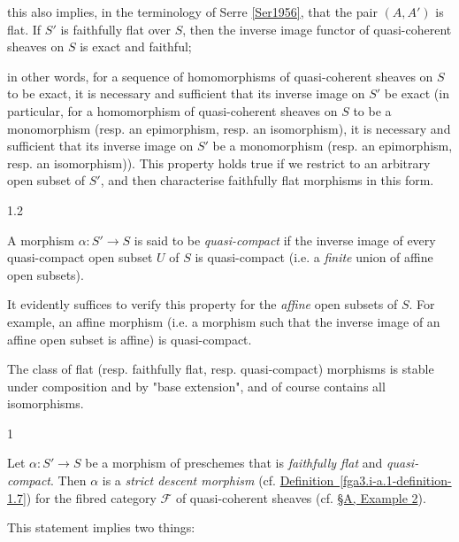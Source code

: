   this also implies, in the terminology of Serre \hyperref[Ser1956]{[Ser1956]}, that the pair \((A,A')\) is flat.
  If \(S'\) is faithfully flat over \(S\), then the inverse image functor of quasi-coherent sheaves on \(S\) is exact and faithful;
  
  in other words, for a sequence of homomorphisms of quasi-coherent sheaves on \(S\) to be exact, it is necessary and sufficient that its inverse image on \(S'\) be exact (in particular, for a homomorphism of quasi-coherent sheaves on \(S\) to be a monomorphism (resp. an epimorphism, resp. an isomorphism), it is necessary and sufficient that its inverse image on \(S'\) be a monomorphism (resp. an epimorphism, resp. an isomorphism)).
  This property holds true if we restrict to an arbitrary open subset of \(S'\), and then characterise faithfully flat morphisms in this form.\begin{definition}{1.2}\label{fga3.i-b.1-definition-1.2}\skipsinglepar\par{}A morphism \(\alpha \colon  S'\to  S\) is said to be \emph{quasi-compact} if the inverse image of every quasi-compact open subset \(U\) of \(S\) is quasi-compact (i.e. a \emph{finite} union of affine open subsets).\end{definition}\par{}It evidently suffices to verify this property for the \emph{affine} open subsets of \(S\).
  For example, an affine morphism (i.e. a morphism such that the inverse image of an affine open subset is affine) is quasi-compact.\par{}The class of flat (resp. faithfully flat, resp. quasi-compact) morphisms is stable under composition and by "base extension", and of course contains all isomorphisms.\begin{theorem}{1}\label{fga3.i-b.1-theorem-1}\skipsinglepar\par{}Let \(\alpha \colon  S'\to  S\) be a morphism of preschemes that is \emph{faithfully flat} and \emph{quasi-compact}.
    Then \(\alpha \) is a \emph{strict descent morphism} (cf. \hyperref[fga3.i-a.1-definition-1.7]{Definition~\ref*{fga3.i-a.1-definition-1.7}}) for the fibred category \(\mathcal {F}\) of quasi-coherent sheaves (cf. \hyperref[fga3.i-a.1-example-2]{§A, Example 2}).\end{theorem}\par{}This statement implies two things:

